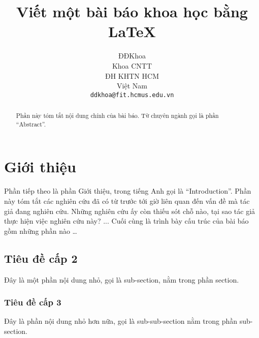 \documentclass[a4paper]{article}
\begin{document}
\title{Viết một bài báo khoa học bằng \LaTeX}

\author{
ĐĐKhoa \\ Khoa CNTT\\ ĐH KHTN HCM\\ Việt Nam\\ \texttt{ddkhoa@fit.hcmus.edu.vn}
%
}

\date{}
\maketitle

\begin{abstract}
Phần này tóm tắt nội dung chính của bài báo. Từ chuyên ngành gọi là phần ``Abstract''. %

\end{abstract}


\section{Giới thiệu}
\indent \indent Phần tiếp theo 		là phần Giới thiệu\indent , trong tiếng Anh gọi là ``Introduction''. Phần này tóm tắt các nghiên cứu đã có từ trước tới giờ liên quan đến vấn đề mà tác giả đang nghiên cứu. Những nghiên cứu ấy còn thiếu sót chỗ nào, tại sao tác giả thực hiện việc nghiên cứu này? ... Cuối cùng là trình bày cấu trúc của bài báo gồm những phần nào \ldots 

\subsection{Tiêu đề cấp 2}
Đây là một phần nội dung nhỏ, gọi là sub-section, nằm trong phần section.

\subsubsection{Tiêu đề cấp 3}
Đây là phần nội dung nhỏ hơn nữa, gọi là sub-sub-section nằm trong phần sub-section.
\end{document}
